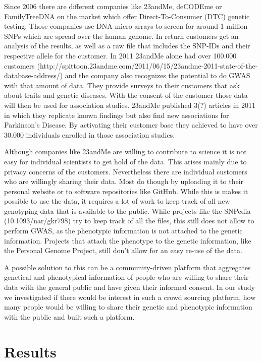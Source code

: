 \documentclass[10pt]{article}
\begin{document}
Since 2006 there are different companies like 23andMe, deCODEme or FamilyTreeDNA on the market which offer Direct-To-Consumer (DTC) genetic testing. Those companies use DNA micro arrays to screen for around 1 million SNPs which are spread over the human genome. In return customers get an analysis of the results, as well as a raw file that includes the SNP-IDs and their respective allele for the customer. In 2011 23andMe alone had over 100.000 customers (http://spittoon.23andme.com/2011/06/15/23andme-2011-state-of-the-database-address/) and the company also recognizes the potential to do GWAS with that amount of data. They provide surveys to their customers that ask about traits and genetic diseases. With the consent of the customer those data will then be used for association studies. 23andMe published 3(?) articles in 2011 in which they replicate known findings but also find new associations for Parkinson's Disease. By activating their customer base they achieved to have over 30.000 individuals enrolled in those association studies.  

Although companies like 23andMe are willing to contribute to science it is not easy for individual scientists to get hold of the data. This arises mainly due to privacy concerns of the customers. Nevertheless there are individual customers who are willingly sharing their data. Most do though by uploading it to their personal website or to software repositories like GitHub. While this is makes it possible to use the data, it requires a lot of work to keep track of all new genotyping data that is available to the public. While projects like the SNPedia (10.1093/nar/gkr798) try to keep track of all the files, this still does not allow to perform GWAS, as the phenotypic information is not attached to the genetic information. Projects that attach the phenotype to the genetic information, like the Personal Genome Project, still don't allow for an easy re-use of the data.  

A possible solution to this can be a community-driven platform that aggregates genetical and phenotypical information of people who are willing to share their data with the general public and have given their informed consent. In our study we investigated if there would be interest in such a crowd sourcing platform, how many people would be willing to share their genetic and phenotypic information with the public and built such a platform. 

\section*{Results}
\end{document}
